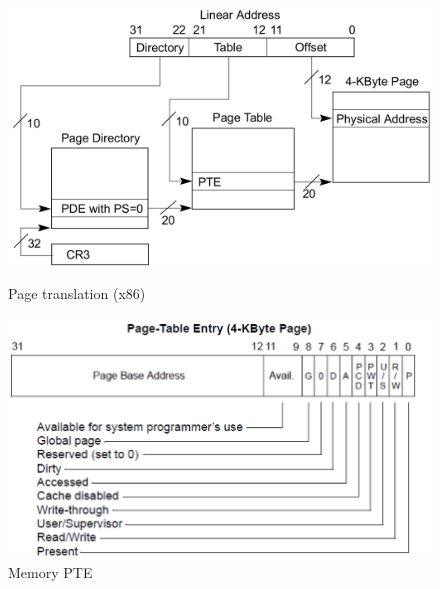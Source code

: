 \documentclass[../../lectures.tex]{subfiles}
\begin{document}
\begin{figure}[H]
\begin{minipage}[c]{0.5\linewidth}
\centering
\includegraphics[width=\textwidth]{images/memory-x86-page-translation.png}
\caption{Page translation (x86)}
\end{minipage}
\hspace{0.5cm}
\begin{minipage}[c]{0.5\linewidth}
\centering
\includegraphics[width=\textwidth]{images/memory-pte.png}
\caption{Memory PTE}
\end{minipage}
\end{figure}
\end{document}
